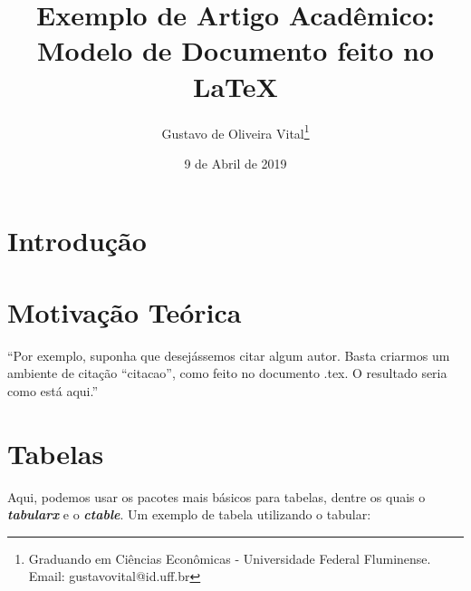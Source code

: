 \documentclass[onehalfspacing, a4paper, 12pt]{econometria}
\author{Gustavo de Oliveira Vital\thanks{Graduando em Ciências Econômicas - Universidade Federal Fluminense. Email: gustavovital@id.uff.br}}
\title{Exemplo de Artigo Acadêmico: Modelo de Documento feito no \LaTeX}
\date{9 de Abril de 2019}
\begin{document}
\cabecalho


\section*{Introdução}
\lipsum[2]

\section{Motivação Teórica}
\lipsum[6-7]


\begin{citacao}
``Por exemplo, suponha que desejássemos citar algum autor. Basta criarmos um ambiente de citação ``citacao'', como feito no documento .tex. O resultado seria como está aqui.'' 
\end{citacao}


\section{Tabelas}

Aqui, podemos usar os pacotes mais básicos para tabelas, dentre os quais o \textbf{\textit{tabularx}} e o \textbf{\textit{ctable}}. Um exemplo de tabela utilizando o tabular:
\end{document}
